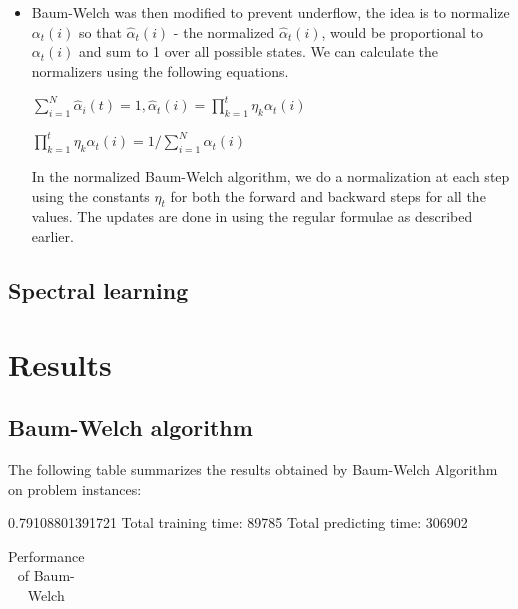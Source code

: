 \documentclass[letterpaper]{article}
\begin{document}
\begin{itemize}
	\item Baum-Welch was then modified  to prevent underflow, the idea is to normalize $\alpha_t(i)$ so that $\hat{\alpha}_{t}(i)$ - the normalized $\hat{\alpha}_{t}(i)$, would be proportional to $\alpha_{t}(i)$ and sum to 1 over all possible states. We can calculate the normalizers using the following equations. 
	      
	      \begin{center}
	      	
	      	$\sum_{i=1}^{N}\hat{\alpha}_{i}(t) = 1 , \hat{\alpha}_{t}(i) = \prod_{k=1}^t\eta_{k}\alpha_{t}(i)$ 
	      	
	      	$\prod_{k=1}^t\eta_{k}\alpha_{t}(i) = 1/\sum_{i=1}^N\alpha_{t}(i)$
	      	
	      \end{center}
	      
	      In the normalized Baum-Welch algorithm, we do a normalization at each step using the constants $\eta_{t}$ for both the forward and backward steps for all the values. The updates are done in using the regular formulae as described earlier.
	       
\end{itemize}

\subsection{Spectral learning}



\section{Results}

\subsection{Baum-Welch algorithm}
The following table summarizes the results obtained by Baum-Welch Algorithm on problem instances:

0.79108801391721
Total training time: 89785
Total predicting time: 306902


\begin{table}[h]
\caption{Performance of Baum-Welch}
\label{sample-table}
\begin{center}
\begin{tabular}{llll}\end{tabular}
\end{center}
\end{table}
\end{document}
